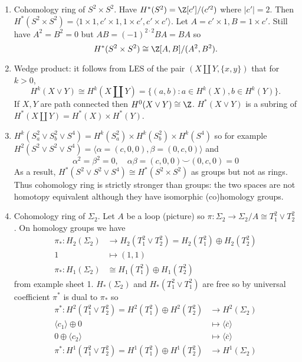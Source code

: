 \documentclass[a4paper]{article}
\newcommand*{\cp}{\smile} %
\begin{document}
\begin{eg}
\begin{enumerate}
  \item Cohomology ring of \(S^2 \times S^2\). Have \(H^*(S^2) = \Z[c']/(c'^2)\) where \(|c'| = 2\). Then \(H^*(S^2 \times S^2) = \langle 1 \times 1, c' \times 1, 1 \times c', c' \times c' \rangle\). Let \(A = c' \times 1, B = 1 \times c'\). Still have \(A^2 = B^2 = 0\) but \(AB = (-1)^{2 \cdot 2} BA = BA\) so
    \[
      H^*(S^2 \times S^2) \cong \Z[A, B]/(A^2, B^2).
    \]
  \item Wedge product: it follows from LES of the pair \((X \amalg Y, \{x, y\})\) that for \(k > 0\),
    \[
      H^k(X \vee Y) \cong H^k(X \amalg Y) = \{(a, b): a \in H^k(X), b \in H^k(Y)\}.
    \]
    If \(X, Y\) are path connected then \(H^0(X \vee Y) \cong \Z\). \(H^*(X \vee Y)\) is a subring of \(H^*(X \amalg Y) = H^*(X) \times H^*(Y)\).
  \item \(H^k(S^2_a \vee S^2_b \vee S^4) = H^k(S^2_a) \times H^k(S^2_b) \times H^k(S^4)\) so for example \(H^2(S^2 \vee S^2 \vee S^4) = \langle \alpha = (c, 0, 0), \beta = (0, c, 0) \rangle\) and
    \[
      \alpha^2 = \beta^2 = 0, \quad \alpha\beta = (c, 0, 0) \cp (0, c, 0) = 0
    \]
    As a result, \(H^*(S^2 \vee S^2 \vee S^4) \cong H^*(S^2 \times S^2)\) as groups but not as rings. Thus cohomology ring is strictly stronger than groups: the two spaces are not homotopy equivalent although they have isomorphic (co)homology groups.
  \item Cohomology ring of \(\Sigma_2\). Let \(A\) be a loop (picture) so \(\pi: \Sigma_2 \to \Sigma_2/A \cong T_1^2 \vee T_2^2\). On homology groups we have
    \begin{align*}
      \pi_*: H_2(\Sigma_2) &\to H_2(T_1^2 \vee T_2^2) = H_2(T_1^2) \oplus H_2(T_2^2) \\
      1 &\mapsto (1, 1) \\
      \pi_*: H_1(\Sigma_2) &\cong H_1(T_1^2) \oplus H_1(T_2^2)
    \end{align*}
    from example sheet 1. \(H_*(\Sigma_2)\) and \(H_*(T_1^2 \vee T_1^2)\) are free so by universal coefficient \(\pi^*\) is dual to \(\pi_*\) so
    \begin{align*}
      \pi^*: H^2(T_1^2 \vee T_2^2) = H^2(T_1^2) \oplus H^2(T_2^2) &\to H^2(\Sigma_2) \\
      \langle c_1\rangle \oplus 0 &\mapsto \langle \overline c \rangle \\
      0 \oplus \langle c_2 \rangle &\mapsto \langle \overline c \rangle \\
      \pi^*: H^1(T_1^2 \vee T_2^2) = H^1(T_1^2) \oplus H^1(T_2^2) &\to H^1(\Sigma_2) \\

\end{align*}
\end{enumerate}
\end{eg}
\end{document}
